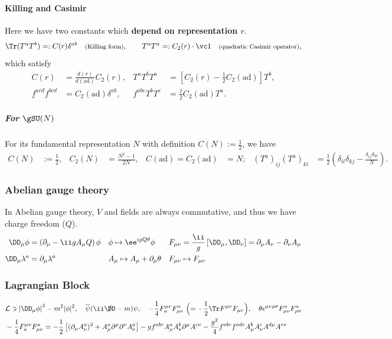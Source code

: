 \paragraph{Killing and Casimir}
Here we have two constants which {\bf depend on representation $r$}.
\begin{equation}
    \Tr(T^aT^b) =: C(r)\delta^{ab}\quad \text{\footnotesize(Killing form)},\qquad
    T^aT^a =: C_2(r)\cdot\vc 1\quad \text{\footnotesize(quadratic Casimir operator)},
\end{equation}
which satisfy\vskip-30pt
\begin{align}
   C(r) &= \frac{d(r)}{d(\text{ad})}C_2(r),&
 T^aT^bT^a&=\left[C_2(r)-\frac12 C_2(\text{ad})\right]T^b,\\
 f^{acd}f^{bcd} &= C_2(\text{ad})\delta^{ab},&
 f^{abc}T^bT^c &= \frac\ii2 C_2(\text{ad})T^a.
\end{align}


\subparagraph{For $\gSU(N)$}For its fundamental representation $N$ with definition $C(N):=\frac12$, we have
\begin{align*}
  C(N)&:=\frac12, & C_2(N)&= \frac{N^2-1}{2N}, & C(\text{ad}) =
 C_2(\text{ad}) &= N;&
  (T^a)_{ij}(T^a)_{kl} &= \frac12\left(\delta_{il}\delta_{kj}-\frac{\delta_{ij}\delta_{kl}}{N}\right).
\end{align*}

\subsubsection{Abelian gauge theory}\label{sec:abelian-gauge-theory}
In Abelian gauge theory, $V$ and fields are always commutative, and thus we have charge freedom ($Q$).
\begin{align*}
 \Dm\phi           &=       \left(\Pm-\ii g A_\mu Q\right)\phi&
 &\phi              \mapsto  \ee^{igQ\theta}\phi&
 &F_{\mu\nu}        =       \frac\ii g\left[\Dm,\Dn\right] = \Pm A_\nu-\Pn A_\mu\\
 \Dm\lambda^a     &=       \Pm\lambda^a&
 &A_\mu             \mapsto  A_\mu + \Pm\theta&
 &F_{\mu\nu}        \mapsto  F_{\mu\nu}
\end{align*}

\subsubsection{Lagrangian Block}\vspace{-2em}
\begin{align}
 &\Lag \ni \left|\Dm\phi\right|^2-m^2|\phi|^2, \quad
          \overline\psi(\ii\slashed\DD-m)\psi,\quad
          -\frac14F_a^{\mu\nu}F^a_{\mu\nu}\ \Bigl(=-\frac12\Tr F^{\mu\nu}F_{\mu\nu}\Bigr),\quad
          \theta\epsilon^{\mu\nu\rho\sigma}F^a_{\mu\nu}F^a_{\rho\sigma}\\
 &-\frac14F_a^{\mu\nu}F^a_{\mu\nu}
  = -\frac12\left[
       (\Pm A^a_\nu)^2 +A^a_\mu\Pmu\Pnu A^a_\nu
 \right]
    - gf^{abc}A_\mu^a A_\nu^b \Pmu A^{c\nu}
    - \frac{g^2}4 f^{abc}f^{ade}A^b_\mu A^c_\nu A^{d\mu}A^{e\nu}
\end{align}

